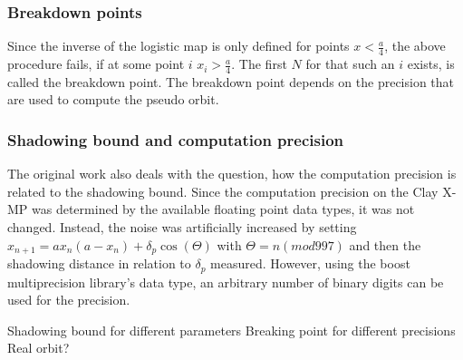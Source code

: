   \subsubsection{Breakdown points}
  Since the inverse of the logistic map is only defined for points $x < \frac{a}{4}$, the above procedure fails, if at some point $i$ $x_i > \frac{a}{4}$. The first $N$ for that such an $i$ exists, is called the breakdown point.
  The breakdown point depends on the precision that are used to compute the pseudo orbit. 
  \subsubsection{Shadowing bound and computation precision}
  The original work also deals with the question, how the computation precision is related to the shadowing bound. 
  Since the computation precision on the Clay X-MP was determined by the available floating point data types, it was not changed. Instead, the noise was artificially increased by setting $x_{n+1} = ax_n(a-x_n)+\delta_p \cos (\Theta)$ with $\Theta = n (mod 997)$ and then the shadowing distance in relation to $\delta_p$ measured.
  However, using the boost multiprecision library's  data type, an arbitrary number of binary digits can be used for the precision.


  Shadowing bound for different parameters
  Breaking point for different precisions
  Real orbit?
